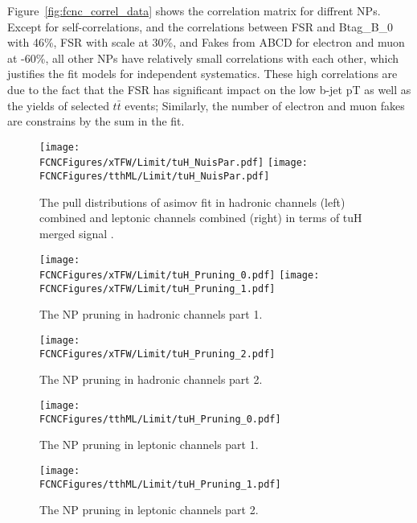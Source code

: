 Figure~\ref{fig:fcnc_correl_data} shows the correlation matrix for diffrent NPs. Except for self-correlations, and the correlations between FSR and Btag\_B\_0 with 46\%,
FSR with scale at 30\%, and Fakes from ABCD for electron and muon at -60\%, all other NPs have relatively small correlations with each other, which justifies the fit models for independent systematics. These high correlations are due to the fact that the FSR has significant impact on the low b-jet pT as well as the yields of selected
$t\bar t$ events; Similarly, the number of electron and muon fakes are constrains by the sum in the fit.   




\begin{figure}[htb]
\centering
\texttt{[image: \\FCNCFigures/xTFW/Limit/tuH\_NuisPar.pdf]}
\texttt{[image: \\FCNCFigures/tthML/Limit/tuH\_NuisPar.pdf]}
\caption{ The pull distributions of asimov fit in hadronic channels (left) combined and leptonic channels combined (right) in terms of tuH merged signal . }
\label{fig:fcnc_pull_data}
\end{figure}


\begin{figure}[htb]
\centering
\texttt{[image: \\FCNCFigures/xTFW/Limit/tuH\_Pruning\_0.pdf]}
\texttt{[image: \\FCNCFigures/xTFW/Limit/tuH\_Pruning\_1.pdf]}
\caption{ The NP pruning in hadronic channels part 1. }
\label{fig:xTFW_pruning_0}
\end{figure}

\begin{figure}[htb]
\centering
\texttt{[image: \\FCNCFigures/xTFW/Limit/tuH\_Pruning\_2.pdf]}
\caption{ The NP pruning in hadronic channels part 2. }
\label{fig:xTFW_pruning_1}
\end{figure}


\begin{figure}[htb]
\centering
\texttt{[image: \\FCNCFigures/tthML/Limit/tuH\_Pruning\_0.pdf]}
\caption{ The NP pruning in leptonic channels part 1. }
\label{fig:tthML_pruning_0}
\end{figure}

\begin{figure}[htb]
\centering
\texttt{[image: \\FCNCFigures/tthML/Limit/tuH\_Pruning\_1.pdf]}
\caption{ The NP pruning in leptonic channels part 2. }
\label{fig:tthML_pruning_1}
\end{figure}

